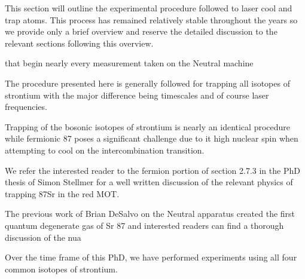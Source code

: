 This section will outline the experimental procedure followed to laser cool and trap atoms. This process has remained relatively stable throughout the years so we provide only a brief overview and reserve the detailed discussion to the relevant sections following this overview.

that begin nearly every measurement taken on the Neutral machine

 The procedure presented here is generally followed for trapping all isotopes of strontium with the major difference being timescales and of course laser frequencies.

Trapping of the bosonic isotopes of strontium is nearly an identical procedure while fermionic 87 poses a significant challenge due to it high nuclear spin when attempting to cool on the intercombination transition. 

We refer the interested reader to the fermion portion of section 2.7.3 in the PhD thesis of Simon Stellmer for a well written discussion of the relevant physics of trapping 87Sr in the red MOT.

The previous work of Brian DeSalvo on the Neutral apparatus created the first quantum degenerate gas of Sr 87 and interested readers can find a thorough discussion of the nua

Over the time frame of this PhD, we have performed experiments using all four common isotopes of strontium.



